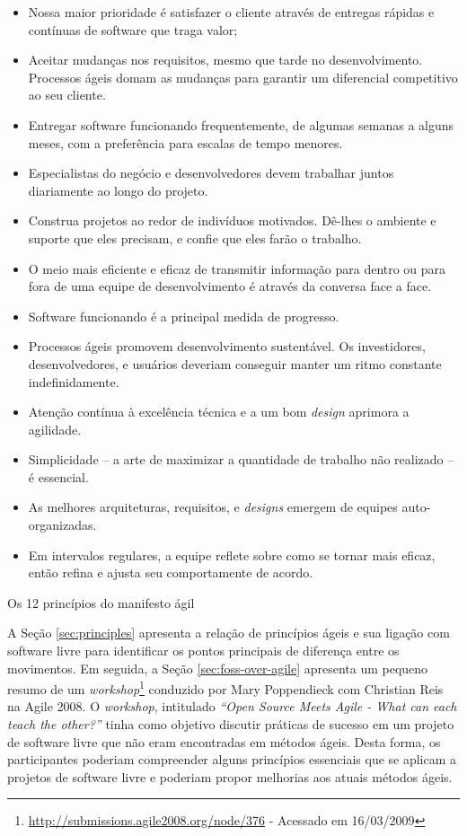 \begin{caixa}[htb]
\begin{minipage}{\linewidth}
    \begin{itemize}
    \item Nossa maior prioridade é satisfazer o cliente através de
      entregas rápidas e contínuas de software que traga valor;
    \item Aceitar mudanças nos requisitos, mesmo que tarde no
      desenvolvimento. Processos ágeis domam as mudanças para garantir
      um diferencial competitivo ao seu cliente.
    \item Entregar software funcionando frequentemente, de algumas
      semanas a alguns meses, com a preferência para escalas de tempo
      menores.
    \item Especialistas do negócio e desenvolvedores devem trabalhar
      juntos diariamente ao longo do projeto.
    \item Construa projetos ao redor de indivíduos motivados. Dê-lhes
      o ambiente e suporte que eles precisam, e confie que eles farão
      o trabalho.
    \item O meio mais eficiente e eficaz de transmitir informação para
      dentro ou para fora de uma equipe de desenvolvimento é através
      da conversa face a face.
    \item Software funcionando é a principal medida de progresso.
    \item Processos ágeis promovem desenvolvimento sustentável. Os
      investidores, desenvolvedores, e usuários deveriam conseguir
      manter um ritmo constante indefinidamente.
    \item Atenção contínua à excelência técnica e a um bom
      \textit{design} aprimora a agilidade.
    \item Simplicidade -- a arte de maximizar a quantidade de trabalho
      não realizado -- é essencial.
    \item As melhores arquiteturas, requisitos, e \textit{designs}
      emergem de equipes auto-organizadas.
    \item Em intervalos regulares, a equipe reflete sobre como se
      tornar mais eficaz, então refina e ajusta seu comportamente de
      acordo.
    \end{itemize}
  \end{minipage}
  \caption{Os 12 princípios do manifesto ágil}
  \label{box:principles}
\end{caixa}

A Seção \ref{sec:principles} apresenta a relação de princípios ágeis e
sua ligação com software livre para identificar os pontos principais
de diferença entre os movimentos. Em seguida, a Seção
\ref{sec:foss-over-agile} apresenta um pequeno resumo de um
\textit{workshop}\footnote{\url{http://submissions.agile2008.org/node/376}
  - Acessado em 16/03/2009} conduzido por Mary Poppendieck com
Christian Reis na Agile 2008. O \textit{workshop}, intitulado
\textit{``Open Source Meets Agile - What can each teach the other?''}
tinha como objetivo discutir práticas de sucesso em um projeto de
software livre que não eram encontradas em métodos ágeis. Desta forma,
os participantes poderiam compreender alguns princípios essenciais que
se aplicam a projetos de software livre e poderiam propor melhorias
aos atuais métodos ágeis.

